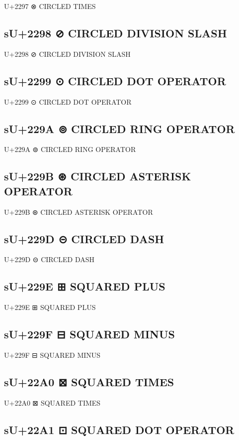 U+2297 ⊗ CIRCLED TIMES

\subsection{sU+2298 ⊘ CIRCLED DIVISION SLASH}

U+2298 ⊘ CIRCLED DIVISION SLASH

\subsection{sU+2299 ⊙ CIRCLED DOT OPERATOR}

U+2299 ⊙ CIRCLED DOT OPERATOR

\subsection{sU+229A ⊚ CIRCLED RING OPERATOR}

U+229A ⊚ CIRCLED RING OPERATOR

\subsection{sU+229B ⊛ CIRCLED ASTERISK OPERATOR}

U+229B ⊛ CIRCLED ASTERISK OPERATOR

\subsection{sU+229D ⊝ CIRCLED DASH}

U+229D ⊝ CIRCLED DASH

\subsection{sU+229E ⊞ SQUARED PLUS}

U+229E ⊞ SQUARED PLUS

\subsection{sU+229F ⊟ SQUARED MINUS}

U+229F ⊟ SQUARED MINUS

\subsection{sU+22A0 ⊠ SQUARED TIMES}

U+22A0 ⊠ SQUARED TIMES

\subsection{sU+22A1 ⊡ SQUARED DOT OPERATOR}

